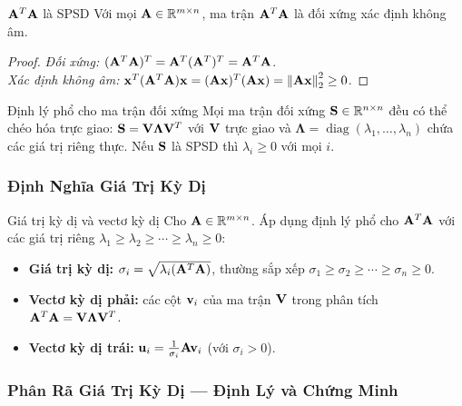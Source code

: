 \begin{myprop}{$\mathbf{A}^T\mathbf{A}$ là SPSD}{}
Với mọi $\mathbf{A} \in \mathbb{R}^{m \times n}$, ma trận $\mathbf{A}^T\mathbf{A}$ là đối xứng
xác định không âm.
\end{myprop}

\begin{proof}
\textit{Đối xứng:} $(\mathbf{A}^T\mathbf{A})^T = \mathbf{A}^T(\mathbf{A}^T)^T = \mathbf{A}^T\mathbf{A}$. \\
\textit{Xác định không âm:} $\mathbf{x}^T(\mathbf{A}^T\mathbf{A})\mathbf{x} =
(\mathbf{A}\mathbf{x})^T(\mathbf{A}\mathbf{x}) = \left\lVert\mathbf{A}\mathbf{x}\right\rVert_2^2 \geq 0$.
\end{proof}

\begin{mythm}{Định lý phổ cho ma trận đối xứng}{}
Mọi ma trận đối xứng $\mathbf{S} \in \mathbb{R}^{n \times n}$ đều có thể chéo hóa trực giao:
$\mathbf{S} = \mathbf{V}\boldsymbol{\Lambda}\mathbf{V}^T$ với $\mathbf{V}$ trực giao và
$\boldsymbol{\Lambda} = \operatorname{diag}(\lambda_1, \ldots, \lambda_n)$ chứa
các giá trị riêng thực. Nếu $\mathbf{S}$ là SPSD thì $\lambda_i \geq 0$ với mọi $i$.
\end{mythm}

\subsubsection{Định Nghĩa Giá Trị Kỳ Dị}

\begin{mydef}{Giá trị kỳ dị và vectơ kỳ dị}{}
Cho $\mathbf{A} \in \mathbb{R}^{m \times n}$. Áp dụng định lý phổ cho $\mathbf{A}^T\mathbf{A}$ với
các giá trị riêng $\lambda_1 \geq \lambda_2 \geq \cdots \geq \lambda_n \geq 0$:
\begin{itemize}[noitemsep]
    \item \textbf{Giá trị kỳ dị:} $\sigma_i = \sqrt{\lambda_i(\mathbf{A}^T\mathbf{A})}$,
          thường sắp xếp $\sigma_1 \geq \sigma_2 \geq \cdots \geq \sigma_n \geq 0$.
    \item \textbf{Vectơ kỳ dị phải:} các cột $\mathbf{v}_i$ của ma trận $\mathbf{V}$
          trong phân tích $\mathbf{A}^T\mathbf{A} = \mathbf{V}\boldsymbol{\Lambda}\mathbf{V}^T$.
    \item \textbf{Vectơ kỳ dị trái:} $\mathbf{u}_i = \frac{1}{\sigma_i}\mathbf{A}\mathbf{v}_i$
          (với $\sigma_i > 0$).
\end{itemize}
\end{mydef}

\subsubsection{Phân Rã Giá Trị Kỳ Dị — Định Lý và Chứng Minh}

